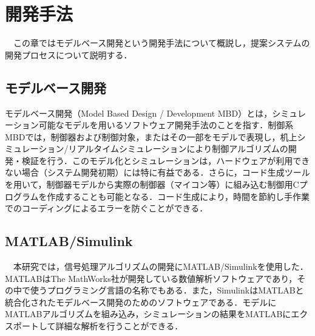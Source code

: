 \chapter{開発手法}
　この章ではモデルベース開発という開発手法について概説し，提案システムの開発プロセスについて説明する．

\section{モデルベース開発}
モデルベース開発（Model Based Design / Development MBD）とは，シミュレーション可能なモデルを用いるソフトウェア開発手法のことを指す．制御系MBDでは，制御器および制御対象，またはその一部をモデルで表現し，机上シミュレーション/リアルタイムシミュレーションにより制御アルゴリズムの開発・検証を行う．このモデル化とシミュレーションは，ハードウェアが利用できない場合（システム開発初期）には特に有益である．さらに，コード生成ツールを用いて，制御器モデルから実際の制御器（マイコン等）に組み込む制御用Cプログラムを作成することも可能となる．コード生成により，時間を節約し手作業でのコーディングによるエラーを防ぐことができる\cite{MBD_Simulink}．

\section{MATLAB/Simulink}
　本研究では，信号処理アルゴリズムの開発にMATLAB/Simulinkを使用した．MATLABはThe MathWorks社が開発している数値解析ソフトウェアであり，その中で使うプログラミング言語の名称でもある\cite{MATLAB_MathWorks}．また，SimulinkはMATLABと統合化されたモデルベース開発のためのソフトウェアである．モデルにMATLABアルゴリズムを組み込み，シミュレーションの結果をMATLABにエクスポートして詳細な解析を行うことができる\cite{Simulink_MathWorks}．



